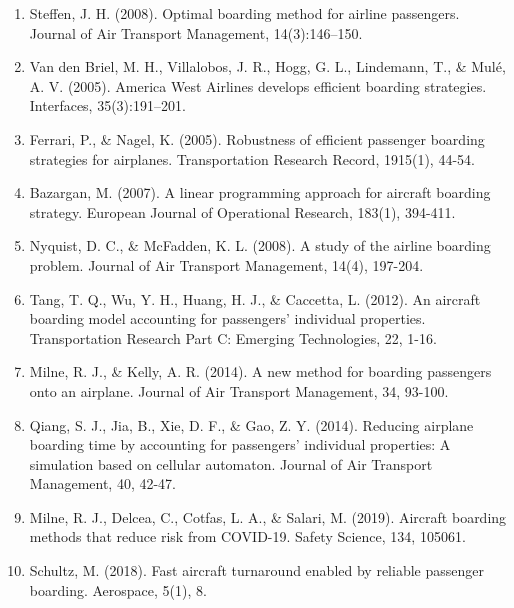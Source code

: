 \documentclass[12pt]{article}
\begin{document}
\begin{enumerate}
    \item Steffen, J. H. (2008). Optimal boarding method for airline passengers. Journal of Air Transport Management, 14(3):146–150.
    
    \item Van den Briel, M. H., Villalobos, J. R., Hogg, G. L., Lindemann, T., \& Mul\'e, A. V. (2005). America West Airlines develops efficient boarding strategies. Interfaces, 35(3):191–201.
    
    \item Ferrari, P., \& Nagel, K. (2005). Robustness of efficient passenger boarding strategies for airplanes. Transportation Research Record, 1915(1), 44-54.
    
    \item Bazargan, M. (2007). A linear programming approach for aircraft boarding strategy. European Journal of Operational Research, 183(1), 394-411.
    
    \item Nyquist, D. C., \& McFadden, K. L. (2008). A study of the airline boarding problem. Journal of Air Transport Management, 14(4), 197-204.
    
    \item Tang, T. Q., Wu, Y. H., Huang, H. J., \& Caccetta, L. (2012). An aircraft boarding model accounting for passengers' individual properties. Transportation Research Part C: Emerging Technologies, 22, 1-16.
    
    \item Milne, R. J., \& Kelly, A. R. (2014). A new method for boarding passengers onto an airplane. Journal of Air Transport Management, 34, 93-100.
    
    \item Qiang, S. J., Jia, B., Xie, D. F., \& Gao, Z. Y. (2014). Reducing airplane boarding time by accounting for passengers' individual properties: A simulation based on cellular automaton. Journal of Air Transport Management, 40, 42-47.
    
    \item Milne, R. J., Delcea, C., Cotfas, L. A., \& Salari, M. (2019). Aircraft boarding methods that reduce risk from COVID-19. Safety Science, 134, 105061.
    
    \item Schultz, M. (2018). Fast aircraft turnaround enabled by reliable passenger boarding. Aerospace, 5(1), 8.
\end{enumerate}
\end{document}
